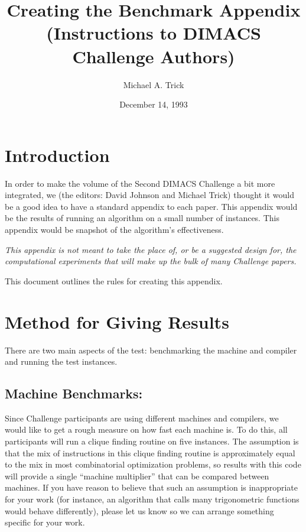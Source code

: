 \title{Creating the Benchmark Appendix\\(Instructions to DIMACS
  Challenge Authors)}
\date{December 14, 1993}
\author{Michael A. Trick}


\maketitle
\section{Introduction}
In order to make the volume of the Second DIMACS Challenge a bit more
integrated, we (the editors: David Johnson and Michael Trick) thought
it would be a good idea to have a standard appendix to each paper.
This appendix would be the results of running an algorithm on a small
number of instances.  This appendix would be snapshot of the
algorithm's effectiveness.

{\it This appendix is not meant to take the place of, or be a
  suggested design for, the computational experiments that will make
  up the bulk of many Challenge papers.}

This document outlines the rules for creating this appendix.

\section{Method for Giving Results}

There are two main aspects of the test:  benchmarking the machine and
compiler and running the test instances.

\subsection{Machine Benchmarks:}  Since Challenge participants are
using different machines and compilers, we would like to get a rough
measure on how fast each machine is.  To do this, all participants
will run a clique finding routine on five instances.  The assumption
is that the mix of instructions in this clique finding routine is
approximately equal to the mix in most combinatorial optimization
problems, so results with this code will provide a single ``machine
multiplier'' that can be compared between machines.  If you have
reason to believe that such an assumption is inappropriate for your
work (for instance, an algorithm that calls many trigonometric
functions would behave differently), please let us know so we can
arrange something specific for your work.

